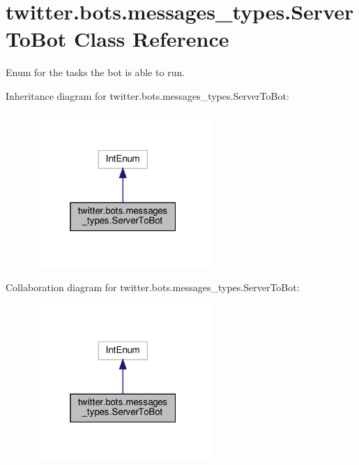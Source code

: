 \hypertarget{classtwitter_1_1bots_1_1messages__types_1_1ServerToBot}{}\section{twitter.\+bots.\+messages\+\_\+types.\+Server\+To\+Bot Class Reference}
\label{classtwitter_1_1bots_1_1messages__types_1_1ServerToBot}


Enum for the tasks the bot is able to run.  




Inheritance diagram for twitter.\+bots.\+messages\+\_\+types.\+Server\+To\+Bot\+:\nopagebreak
\begin{figure}[H]
\begin{center}
\leavevmode
\includegraphics[width=193pt]{d9/d4d/classtwitter_1_1bots_1_1messages__types_1_1ServerToBot__inherit__graph}
\end{center}
\end{figure}


Collaboration diagram for twitter.\+bots.\+messages\+\_\+types.\+Server\+To\+Bot\+:\nopagebreak
\begin{figure}[H]
\begin{center}
\leavevmode
\includegraphics[width=193pt]{da/d24/classtwitter_1_1bots_1_1messages__types_1_1ServerToBot__coll__graph}
\end{center}
\end{figure}
